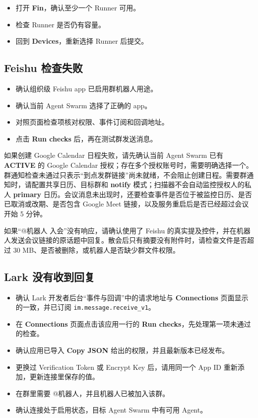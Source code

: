 \documentclass[UTF8,a4paper,11pt]{ctexart}
\begin{document}
\begin{itemize}
  \item 打开 \textbf{Fin}，确认至少一个 Runner 可用。
  \item 检查 Runner 是否仍有容量。
  \item 回到 \textbf{Devices}，重新选择 Runner 后提交。
\end{itemize}

\subsection{Feishu 检查失败}

\begin{itemize}
  \item 确认组织级 Feishu app 已启用群机器人用途。
  \item 确认当前 Agent Swarm 选择了正确的 app。
  \item 对照页面检查项核对权限、事件订阅和回调地址。
  \item 点击 \textbf{Run checks} 后，再在测试群发送消息。
\end{itemize}

如果创建 Google Calendar 日程失败，请先确认当前 Agent Swarm 已有 \textbf{ACTIVE} 的 Google Calendar 授权；存在多个授权账号时，需要明确选择一个。群通知检查未通过只表示“到点发群链接”尚未就绪，不会阻止创建日程。需要群通知时，请配置共享日历、目标群和 \textbf{notify} 模式；扫描器不会自动监控授权人的私人 \textbf{primary} 日历。会议消息未出现时，还要检查事件是否位于被监控日历、是否已取消或改期、是否包含 Google Meet 链接，以及服务重启后是否已经超过会议开始 5 分钟。

如果“@机器人 入会”没有响应，请确认使用了 Feishu 的真实提及控件，并在机器人发送会议链接的原话题中回复。散会后只有摘要没有附件时，请检查文件是否超过 30 MB、是否被删除，或机器人是否缺少群文件权限。

\subsection{Lark 没有收到回复}

\begin{itemize}
  \item 确认 Lark 开发者后台“事件与回调”中的请求地址与 \textbf{Connections} 页面显示的一致，并已订阅 \texttt{im.message.receive\_v1}。
  \item 在 \textbf{Connections} 页面点击该应用一行的 \textbf{Run checks}，先处理第一项未通过的检查。
  \item 确认应用已导入 \textbf{Copy JSON} 给出的权限，并且最新版本已经发布。
  \item 更换过 Verification Token 或 Encrypt Key 后，请用同一个 App ID 重新添加，更新连接里保存的值。
  \item 在群里需要 @机器人，并且机器人已被加入该群。
  \item 确认连接处于启用状态，目标 Agent Swarm 中有可用 Agent。
\end{itemize}
\end{document}
